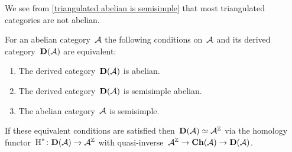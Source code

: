 \documentclass[a4paper,10pt]{scrartcl}
\begin{document}
We see from \cref{triangulated abelian is semisimple} that most triangulated categories are not abelian.

\begin{proposition}
  \label{when the derived is abelian}
  For an abelian category~$\mathcal{A}$ the following conditions on~$\mathcal{A}$ and its derived category~$\mathbf{D}(\mathcal{A})$ are equivalent:
  \begin{enumerate}
    \item
      \label{derived is abelian}
      The derived category~$\mathbf{D}(\mathcal{A})$ is abelian.
    \item
      \label{derived is semisimple abelian}
      The derived category~$\mathbf{D}(\mathcal{A})$ is semisimple abelian.
    \item
      \label{original is semisimple}
      The abelian category~$\mathcal{A}$ is semisimple.
  \end{enumerate}
  If these equivalent conditions are satisfied then~$\mathbf{D}(\mathcal{A}) \simeq \mathcal{A}^{\mathbb{Z}}$ via the homology functor~$\operatorname{H}^* \colon \mathbf{D}(\mathcal{A}) \to \mathcal{A}^{\mathbb{Z}}$ with quasi-inverse~$\mathcal{A}^{\mathbb{Z}} \to \mathbf{Ch}(\mathcal{A}) \to \mathbf{D}(\mathcal{A})$.
\end{proposition}
\end{document}

